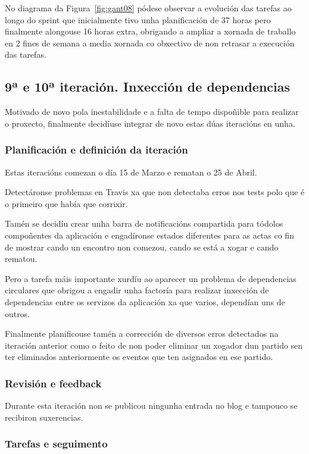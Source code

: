         No diagrama da Figura~\ref{fig:gant08} pódese observar a evolución das 
tarefas ao longo do sprint que inicialmente tivo unha planificación de 37 horas 
pero finalmente alongouse 16 horas extra, obrigando a ampliar a xornada de 
traballo en 2 fines de semana a media xornada co obxectivo de non retrasar a 
execución das tarefas.

    \subsection{9ª e 10ª iteración. Inxección de dependencias}
    Motivado de novo pola inestabilidade e a falta de tempo dispoñible para 
realizar o proxecto, finalmente decidíuse integrar de novo estas dúas iteracións 
en unha.

      \subsubsection{Planificación e definición da iteración}
      Estas iteracións comezan o día 15 de Marzo e rematan o 25 de Abril.

      Detectáronse problemas en Travis xa que non detectaba erros nos tests 
polo que é o primeiro que había que corrixir.

      Tamén se decidíu crear unha barra de notificacións compartida para 
tódolos compoñentes da aplicación e engadíronse estados diferentes para as 
actas co fin de mostrar cando un encontro non comezou, cando se está a xogar e 
cando rematou.

      Pero a tarefa máis importante xurdíu ao aparecer un problema de 
dependencias circulares que obrigou a engadir unha factoría para realizar 
inxección de dependencias entre os servizos da aplicación xa que varios, 
dependían uns de outros.

      Finalmente planificouse tamén a corrección de diversos erros detectados 
na iteración anterior como o feito de non poder eliminar un xogador dun partido 
sen ter eliminados anteriormente os eventos que ten asignados en ese partido.

      \subsubsection{Revisión e feedback}
      Durante esta iteración non se publicou ningunha entrada no blog e 
tampouco se recibiron suxerencias.

      \subsubsection{Tarefas e seguimento}

